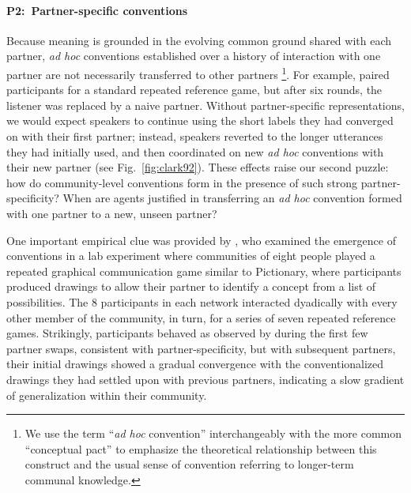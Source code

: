 \paragraph{P2:~Partner-specific conventions}
Because meaning is grounded in the evolving common ground shared with each partner, \emph{ad hoc} conventions established over a history of interaction with one partner are not necessarily transferred to other partners \cite{metzing_when_2003,weber_cultural_2003,brown2009partner}\footnote{We use the term ``\emph{ad hoc} convention'' \cite<inspired by>{Barsalou83_AdHocCategories} interchangeably with the more common ``conceptual pact''   \cite{BrennanClark96_ConceptualPactsConversation,IbarraTanenhaus16_FlexibilityConceptualPacts} to emphasize the theoretical relationship between this construct and the usual sense of convention referring to longer-term communal knowledge.}. 
For example,  paired participants for a standard repeated reference game, but after six rounds, the listener was replaced by a naive partner. 
Without partner-specific representations, we would expect speakers to continue using the short labels they had converged on with their first partner; instead, speakers reverted to the longer utterances they had initially used, and then coordinated on new \emph{ad hoc} conventions with their new partner (see Fig.~\ref{fig:clark92}).
These effects raise our second puzzle: how do community-level conventions form in the presence of such strong partner-specificity?
When are agents justified in transferring an \emph{ad hoc} convention formed with one partner to a new, unseen partner? 

One important empirical clue was provided by , who examined the emergence of conventions in a lab experiment where communities of eight people played a repeated  graphical communication game similar to Pictionary, where participants produced drawings to allow their partner to identify a concept from a list of possibilities. 
The 8 participants in each network interacted dyadically with every other member of the community, in turn, for a series of seven repeated reference games. 
Strikingly, participants behaved as observed by  during the first few partner swaps, consistent with partner-specificity, but with subsequent partners, their initial drawings showed a gradual convergence with the  conventionalized drawings they had settled upon with previous partners, indicating a slow gradient of generalization within their community.

